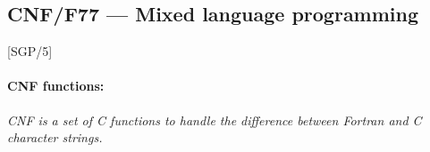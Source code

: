 \begin{description}
\end{description}

\newpage

\subsection{CNF/F77 --- Mixed language programming}

\vspace{-9mm}

\hfill [SGP/5]

\vspace{2mm}

\paragraph{CNF functions:}\hfill

{\em CNF is a set of C functions to handle the difference between Fortran and C
character strings.}

